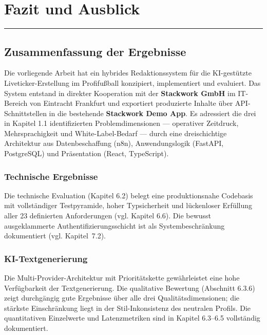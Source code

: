 \chapter{Fazit und Ausblick}\label{fazit-und-ausblick}

\begin{center}\rule{0.5\linewidth}{0.5pt}\end{center}

\section{Zusammenfassung der
Ergebnisse}\label{zusammenfassung-der-ergebnisse}

Die vorliegende Arbeit hat ein hybrides Redaktionssystem für die
KI-gestützte Liveticker-Erstellung im Profifußball konzipiert,
implementiert und evaluiert. Das System entstand in direkter Kooperation
mit der \textbf{Stackwork GmbH} im IT-Bereich von Eintracht Frankfurt
und exportiert produzierte Inhalte über API-Schnittstellen in die
bestehende \textbf{Stackwork Demo App}. Es adressiert die drei in
Kapitel 1.1 identifizierten Problemdimensionen --- operativer Zeitdruck,
Mehrsprachigkeit und White-Label-Bedarf --- durch eine dreischichtige
Architektur aus Datenbeschaffung (n8n), Anwendungslogik (FastAPI,
PostgreSQL) und Präsentation (React, TypeScript).

\subsection{Technische Ergebnisse}\label{technische-ergebnisse}

Die technische Evaluation (Kapitel 6.2) belegt eine produktionsnahe
Codebasis mit vollständiger Testpyramide, hoher Typsicherheit und
lückenloser Erfüllung aller 23 definierten Anforderungen (vgl. Kapitel
6.6). Die bewusst ausgeklammerte Authentifizierungsschicht ist als
Systembeschränkung dokumentiert (vgl. Kapitel~7.2).

\subsection{KI-Textgenerierung}\label{ki-textgenerierung}

Die Multi-Provider-Architektur mit Prioritätskette gewährleistet eine
hohe Verfügbarkeit der Textgenerierung. Die qualitative Bewertung
(Abschnitt 6.3.6) zeigt durchgängig gute Ergebnisse über alle drei
Qualitätsdimensionen; die stärkste Einschränkung liegt in der
Stil-Inkonsistenz des neutralen Profils. Die quantitativen Einzelwerte
und Latenzmetriken sind in Kapitel 6.3--6.5 vollständig dokumentiert.

